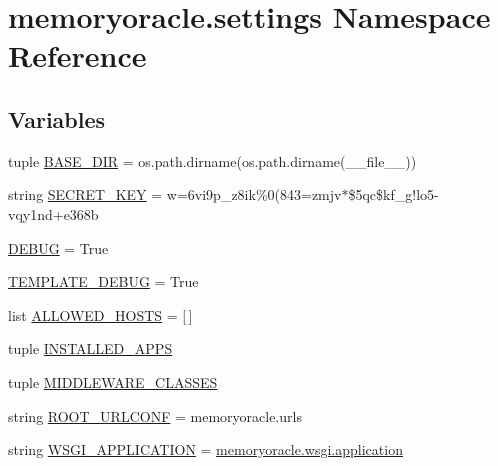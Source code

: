 \hypertarget{namespacememoryoracle_1_1settings}{}\section{memoryoracle.\+settings Namespace Reference}
\label{namespacememoryoracle_1_1settings}
\subsection*{Variables}
\begin{DoxyCompactItemize}
\item 
tuple \hyperlink{namespacememoryoracle_1_1settings_a863b63594639ca54681c195b58eb1b27}{B\+A\+S\+E\+\_\+\+D\+I\+R} = os.\+path.\+dirname(os.\+path.\+dirname(\+\_\+\+\_\+file\+\_\+\+\_\+))
\item 
string \hyperlink{namespacememoryoracle_1_1settings_a8a181b7a3e7e47b16b6900941d5d6284}{S\+E\+C\+R\+E\+T\+\_\+\+K\+E\+Y} = \textquotesingle{}w=6vi9p\+\_\+z8ik\%0(843=zmjv$\ast$\$5qc\$kf\+\_\+g!lo5-\/vqy1nd+e368b\textquotesingle{}
\item 
\hyperlink{namespacememoryoracle_1_1settings_a27514ec5b2f50b45fc52ed1ce0bed93a}{D\+E\+B\+U\+G} = True
\item 
\hyperlink{namespacememoryoracle_1_1settings_adb6dc4ebf65e09f416038d725c2ddec4}{T\+E\+M\+P\+L\+A\+T\+E\+\_\+\+D\+E\+B\+U\+G} = True
\item 
list \hyperlink{namespacememoryoracle_1_1settings_ad8ebc3cca1f2eb2beaab000158d3a26c}{A\+L\+L\+O\+W\+E\+D\+\_\+\+H\+O\+S\+T\+S} = \mbox{[}$\,$\mbox{]}
\item 
tuple \hyperlink{namespacememoryoracle_1_1settings_aa30625d00c355a4e99113af5732a1b76}{I\+N\+S\+T\+A\+L\+L\+E\+D\+\_\+\+A\+P\+P\+S}
\item 
tuple \hyperlink{namespacememoryoracle_1_1settings_a22348e05f0743ec99f37a8cf94154efc}{M\+I\+D\+D\+L\+E\+W\+A\+R\+E\+\_\+\+C\+L\+A\+S\+S\+E\+S}
\item 
string \hyperlink{namespacememoryoracle_1_1settings_a6c9ce7dd487f150eeac964208a5cdec6}{R\+O\+O\+T\+\_\+\+U\+R\+L\+C\+O\+N\+F} = \textquotesingle{}memoryoracle.\+urls\textquotesingle{}
\item 
string \hyperlink{namespacememoryoracle_1_1settings_ad4789b93d4ce7e968b078d08624ec529}{W\+S\+G\+I\+\_\+\+A\+P\+P\+L\+I\+C\+A\+T\+I\+O\+N} = \textquotesingle{}\hyperlink{namespacememoryoracle_1_1wsgi_aa19120d9c42407746c9676a96206f976}{memoryoracle.\+wsgi.\+application}\textquotesingle{}
\item 

\end{DoxyCompactItemize}

